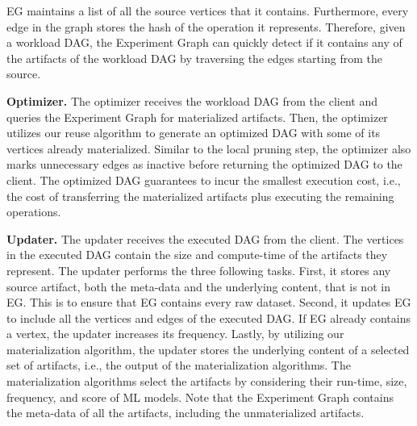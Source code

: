 EG maintains a list of all the source vertices that it contains.
Furthermore, every edge in the graph stores the hash of the operation it represents.
Therefore, given a workload DAG, the Experiment Graph can quickly detect if it contains any of the artifacts of the workload DAG by traversing the edges starting from the source.

\textbf{Optimizer. }
The optimizer receives the workload DAG from the client and queries the Experiment Graph for materialized artifacts.
Then, the optimizer utilizes our reuse algorithm to generate an optimized DAG with some of its vertices already materialized.
Similar to the local pruning step, the optimizer also marks unnecessary edges as inactive before returning the optimized DAG to the client.
The optimized DAG guarantees to incur the smallest execution cost, i.e., the cost of transferring the materialized artifacts plus executing the remaining operations.

\textbf{Updater.}
The updater receives the executed DAG from the client.
The vertices in the executed DAG contain the size and compute-time of the artifacts they represent.
The updater performs the three following tasks.
First, it stores any source artifact, both the meta-data and the underlying content, that is not in EG.
This is to ensure that EG contains every raw dataset.
Second, it updates EG to include all the vertices and edges of the executed DAG.
If EG already contains a vertex, the updater increases its frequency.
Lastly, by utilizing our materialization algorithm, the updater stores the underlying content of a selected set of artifacts, i.e., the output of the materialization algorithms.
The materialization algorithms select the artifacts by considering their run-time, size, frequency, and score of ML models.
Note that the Experiment Graph contains the meta-data of all the artifacts, including the unmaterialized artifacts.


